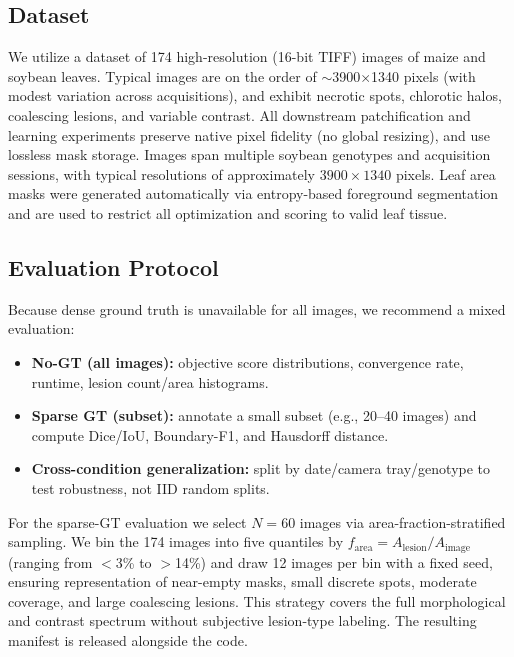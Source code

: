 \documentclass[journal]{IEEEtran}
\begin{document}
\subsection{Dataset}
We utilize a dataset of 174 high-resolution (16-bit TIFF) images of maize and soybean leaves.
Typical images are on the order of $\sim$3900$\times$1340 pixels (with modest variation across acquisitions), and exhibit necrotic spots, chlorotic halos, coalescing lesions, and variable contrast.
All downstream patchification and learning experiments preserve native pixel fidelity (no global resizing), and use lossless mask storage.
Images span multiple soybean genotypes and acquisition sessions, with typical resolutions of approximately $3900 \times 1340$ pixels. Leaf area masks were generated automatically via entropy-based foreground segmentation and are used to restrict all optimization and scoring to valid leaf tissue.

\subsection{Evaluation Protocol}
Because dense ground truth is unavailable for all images, we recommend a mixed evaluation:
\begin{itemize}
    \item \textbf{No-GT (all images):} objective score distributions, convergence rate, runtime, lesion count/area histograms.
    \item \textbf{Sparse GT (subset):} annotate a small subset (e.g., 20--40 images) and compute Dice/IoU, Boundary-F1, and Hausdorff distance.
    \item \textbf{Cross-condition generalization:} split by date/camera tray/genotype to test robustness, not IID random splits.
\end{itemize}
For the sparse-GT evaluation we select $N{=}60$ images via area-fraction-stratified sampling. We bin the 174 images into five quantiles by $f_{\mathrm{area}} = A_{\mathrm{lesion}}/A_{\mathrm{image}}$ (ranging from $<$3\% to $>$14\%) and draw 12 images per bin with a fixed seed, ensuring representation of near-empty masks, small discrete spots, moderate coverage, and large coalescing lesions. This strategy covers the full morphological and contrast spectrum without subjective lesion-type labeling. The resulting manifest is released alongside the code.
\end{document}
